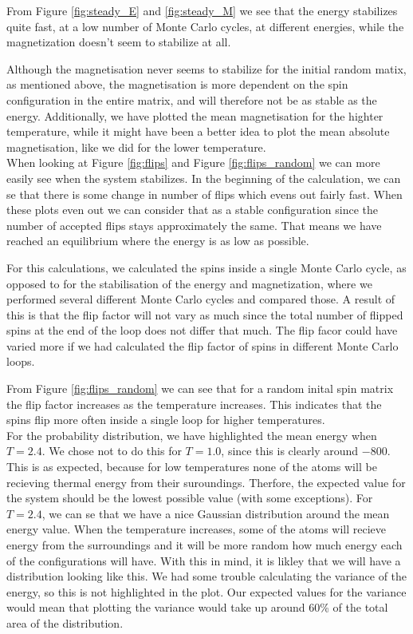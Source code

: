 \documentclass{article}
\begin{document}
{{{	%
	From Figure \ref{fig:steady_E} and \ref{fig:steady_M} we see that the energy stabilizes quite fast, at a low number of Monte Carlo cycles, at different energies, while the magnetization doesn't seem to stabilize at all.

 	Although the magnetisation never seems to stabilize for the initial random matix, as mentioned above, the magnetisation is more dependent on the spin configuration in the entire matrix, and will therefore not be as stable as the energy. Additionally, we have plotted the mean magnetisation for the highter temperature, while it might have been a better idea to plot the mean absolute magnetisation, like we did for the lower temperature.\\

	 When looking at Figure \ref{fig:flips} and Figure \ref{fig:flips_random} we can more easily see when the system stabilizes. In the beginning of the calculation, we can se that there is some change in number of flips which evens out fairly fast. When these plots even out we can consider that as a stable configuration since the number of accepted flips stays approximately the same. That means we have reached an equilibrium where the energy is as low as possible.

	 For this calculations, we calculated the spins inside a single Monte Carlo cycle, as opposed to for the stabilisation of the energy and magnetization, where we performed several different Monte Carlo cycles and compared those. A result of this is that the flip factor will not vary as much since the total number of flipped spins at the end of the loop does not differ that much. The flip facor could have varied more if we had calculated the flip factor of spins in different Monte Carlo loops.

	 From Figure \ref{fig:flips_random} we can see that for a random inital spin matrix the flip factor increases as the temperature increases. This indicates that the spins flip more often inside a single loop for higher temperatures.\\

	For the probability distribution, we have highlighted the mean energy when $T=2.4$. We chose not to do this for $T=1.0$, since this is clearly around $-800$. This is as expected, because for low temperatures none of the atoms will be recieving thermal energy from their suroundings. Therfore, the expected value for the system should be the lowest possible value (with some exceptions). For $T=2.4$, we can se that we have a nice Gaussian distribution around the mean energy value. When the temperature increases, some of the atoms will recieve energy from the surroundings and it will be more random how much energy each of the configurations will have. With this in mind, it is likley that we will have a distribution looking like this. We had some trouble calculating the variance of the energy, so this is not highlighted in the plot. Our expected values for the variance would mean that plotting the variance would take up around 60\% of the total area of the distribution.

}}}
\end{document}
